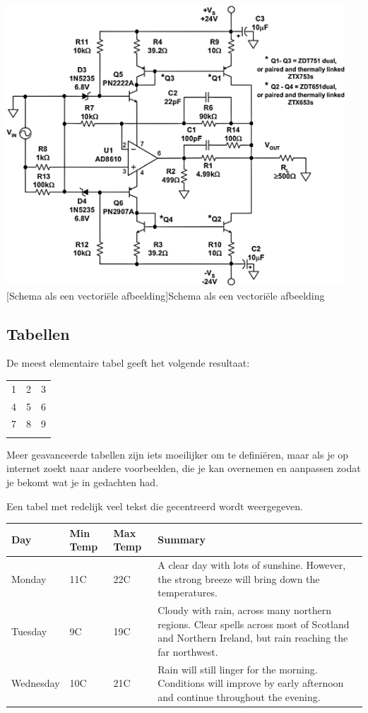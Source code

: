 \begin{center}
\includegraphics[width=0.95\textwidth]{figures/chap2/schema2.pdf}
[Schema als een vectori\"ele afbeelding]{Schema als een vectori\"ele afbeelding\label{fig_voorbeeld3}}
\end{center}

\subsection{Tabellen}

De meest elementaire tabel geeft het volgende resultaat:

\begin{tabular}{ l c r }
  1 & 2 & 3 \\
  4 & 5 & 6 \\
  7 & 8 & 9 \\
\label{eenvoudige tabel}
\end{tabular}

Meer geavanceerde tabellen zijn iets moeilijker om te defini\"eren, maar als je op internet zoekt naar andere voorbeelden, die je kan overnemen en aanpassen zodat je bekomt wat je in gedachten had.

Een tabel met redelijk veel tekst die gecentreerd wordt weergegeven.

\begin{center}
    \begin{tabular}{ | l | l | l | p{5cm} |}
    \hline
    Day & Min Temp & Max Temp & Summary \\ \hline \hline
    Monday & 11C & 22C & A clear day with lots of sunshine.  
    However, the strong breeze will bring down the temperatures. \\ \hline
    Tuesday & 9C & 19C & Cloudy with rain, across many northern regions. Clear spells 
    across most of Scotland and Northern Ireland, 
    but rain reaching the far northwest. \\ \hline
    Wednesday & 10C & 21C & Rain will still linger for the morning. 
    Conditions will improve by early afternoon and continue 
    throughout the evening. \\
    \hline
    \end{tabular}
\label{tb:Xname}
\end{center}

